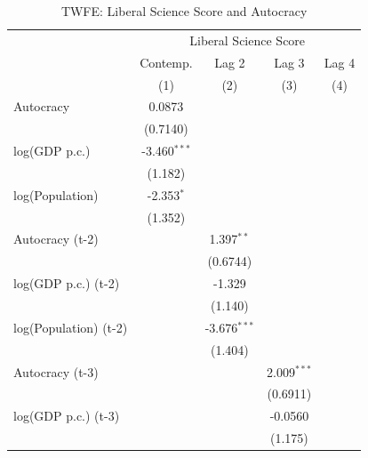 
\begin{table}[htbp]
   \caption{\label{tab:twfe_libscore} TWFE: Liberal Science Score and Autocracy}
   \bigskip
   \centering
   \begin{tabular}{lcccc}
      \toprule
       & \multicolumn{4}{c}{Liberal Science Score}\\
                            & Contemp.       & Lag 2          & Lag 3          & Lag 4 \\   
                            & (1)            & (2)            & (3)            & (4)\\  
      \midrule 
      Autocracy             & 0.0873         &                &                &   \\   
                            & (0.7140)       &                &                &   \\   
      log(GDP p.c.)         & -3.460$^{***}$ &                &                &   \\   
                            & (1.182)        &                &                &   \\   
      log(Population)       & -2.353$^{*}$   &                &                &   \\   
                            & (1.352)        &                &                &   \\   
      Autocracy (t-2)       &                & 1.397$^{**}$   &                &   \\   
                            &                & (0.6744)       &                &   \\   
      log(GDP p.c.) (t-2)   &                & -1.329         &                &   \\   
                            &                & (1.140)        &                &   \\   
      log(Population) (t-2) &                & -3.676$^{***}$ &                &   \\   
                            &                & (1.404)        &                &   \\   
      Autocracy (t-3)       &                &                & 2.009$^{***}$  &   \\   
                            &                &                & (0.6911)       &   \\   
      log(GDP p.c.) (t-3)   &                &                & -0.0560        &   \\   
                            &                &                & (1.175)        &   \\   

\end{tabular}
\end{table}
